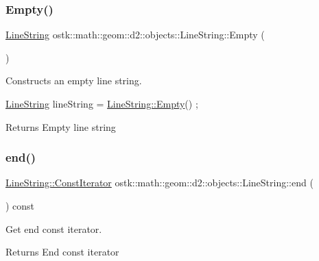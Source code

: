\subsubsection{\texorpdfstring{Empty()}{Empty()}}
{\footnotesize\ttfamily \hyperlink{classostk_1_1math_1_1geom_1_1d2_1_1objects_1_1_line_string}{Line\+String} ostk\+::math\+::geom\+::d2\+::objects\+::\+Line\+String\+::\+Empty (\begin{DoxyParamCaption}{ }\end{DoxyParamCaption})\hspace{0.3cm}{\ttfamily [static]}}



Constructs an empty line string. 


\begin{DoxyCode}
\hyperlink{classostk_1_1math_1_1geom_1_1d2_1_1objects_1_1_line_string_ae99b409ec3eddf804a7c83f2452b1249}{LineString} lineString = \hyperlink{classostk_1_1math_1_1geom_1_1d2_1_1objects_1_1_line_string_a3557befd15577368d8cc2f9c2a74dfec}{LineString::Empty}() ;
\end{DoxyCode}


\begin{DoxyReturn}{Returns}
Empty line string 
\end{DoxyReturn}
\mbox{\label{classostk_1_1math_1_1geom_1_1d2_1_1objects_1_1_line_string_ac8336b4c3418337eb1b04f6eb7e11927}} 
\subsubsection{\texorpdfstring{end()}{end()}}
{\footnotesize\ttfamily \hyperlink{classostk_1_1math_1_1geom_1_1d2_1_1objects_1_1_line_string_a29e6326c716bef2ec438534cfdc1e118}{Line\+String\+::\+Const\+Iterator} ostk\+::math\+::geom\+::d2\+::objects\+::\+Line\+String\+::end (\begin{DoxyParamCaption}{ }\end{DoxyParamCaption}) const}



Get end const iterator. 

\begin{DoxyReturn}{Returns}
End const iterator 
\end{DoxyReturn}
\mbox{\label{classostk_1_1math_1_1geom_1_1d2_1_1objects_1_1_line_string_a66969b9cadd8d7b03d3ed1dade26388b}} 
